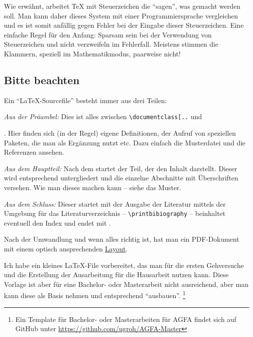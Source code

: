 Wie erwähnt, arbeitet \TeX{} mit Steuerzeichen die \enquote{sagen}, was gemacht werden soll.
Man kann daher dieses System mit einer Programmiersprache vergleichen und es ist somit anfällig gegen Fehler bei der Eingabe dieser Steuerzeichen. 
Eine einfache Regel für den Anfang: Sparsam sein bei der Verwendung von Steuerzeichen und nicht verzweifeln im Fehlerfall.
Meistens stimmen die Klammern, speziell im Mathematikmodus, paarweise nicht!

\subsection{Bitte beachten}
%
Ein \enquote{\LaTeX{}-Sourcefile} besteht immer aus drei Teilen:

\begin{myenumerate} 
	\item 
	\emph{Aus der Präambel:} Dies ist alles zwischen \verb|\documentclass[..| und \par
	\verb||.
	Hier finden sich (in der Regel) eigene Definitionen, der Aufruf von speziellen Paketen, die man als Ergänzung nutzt etc.
	Dazu einfach die Musterdatei und die Referenzen ansehen.
	
	\item
	\emph{Aus dem Hauptteil: } Nach dem \verb!! startet der Teil, der den Inhalt darstellt.
	Dieser wird entsprechend untergliedert und die einzelne Abschnitte mit Überschriften versehen.
	Wie man dieses machen kann -- siehe das Muster.
		
	\item
	\emph{Aus dem Schluss: } Dieser startet mit der Ausgabe der Literatur mittels der Umgebung für das Literaturverzeichnis -- \verb!\printbibiography! -- beinhaltet eventuell den Index \etc und endet mit \verb!!.
	
	\item
	Nach der Umwandlung und wenn alles richtig ist, hat man ein PDF-Dokument mit einem optisch ansprechenden \href{https://de.wikipedia.org/wiki/Layout}{Layout}.
\end{myenumerate}
%
Ich habe ein kleines \LaTeX{}-File vorbereitet, das man für die ersten Gehversuche und die Erstellung der Ausarbeitung für die Hausarbeit nutzen kann.
Diese Vorlage ist aber für eine Bachelor- oder Masterarbeit nicht ausreichend, aber man kann diese als Basis nehmen und entsprechend \enquote{ausbauen}.%
\footnote{Ein Template für Bachelor- oder Masterarbeiten für AGFA findet sich auf GitHub unter \url{https://github.com/ugroh/AGFA-Master}}



